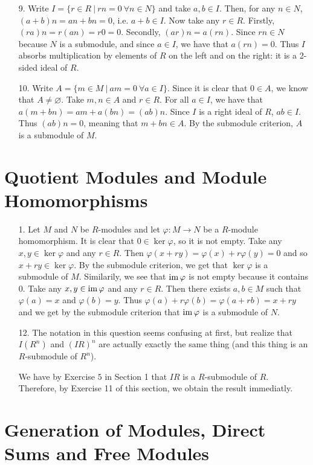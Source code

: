 \begin{enumerate}
\item[9.]
Write $I = \{r\in R\ |\ rn = 0\ \forall n\in N\}$ and take $a,b\in I$. Then, for any $n\in N$, $(a+b)n = an+bn=0$, i.e. $a+b \in I$. Now take any $r\in R$. Firstly, $(ra)n = r(an) = r0 = 0$. Secondly, $(ar)n = a(rn)$. Since $rn \in N$ because $N$ is a submodule, and since $a\in I$, we have that $a(rn)=0$. Thus $I$ absorbs multiplication by elements of $R$ on the left and on the right: it is a 2-sided ideal of $R$.

\item[10.]
Write $A=\{m\in M\ |\ am=0\ \forall a\in I\}$. Since it is clear that $0\in A$, we know that $A\neq\varnothing$. Take $m,n\in A$ and $r \in R$. For all $a\in I$, we have that $a(m+bn) = am+a(bn) = (ab)n$. Since $I$ is a right ideal of $R$, $ab\in I$. Thus $(ab)n=0$, meaning that $m+bn\in A$. By the submodule criterion, $A$ is a submodule of $M$.
\end{enumerate}

\section{Quotient Modules and Module Homomorphisms}

\begin{enumerate}
\item[1.]
Let $M$ and $N$ be $R$-modules and let $\varphi:M\to N$ be a $R$-module homomorphism. It is clear that $0\in\ker\varphi$, so it is not empty. Take any $x,y\in\ker\varphi$ and any $r\in R$. Then $\varphi(x+ry) = \varphi(x)+r\varphi(y)=0$ and so $x+ry\in\ker\varphi$. By the submodule criterion, we get that $\ker\varphi$ is a submodule of $M$.
Similarily, we see that $\operatorname{im}\varphi$ is not empty because it contains $0$. Take any $x,y\in \operatorname{im}\varphi$ and any $r\in R$. Then there exists $a,b\in M$ such that $\varphi(a)=x$ and $\varphi(b)=y$. Thus $\varphi(a)+r\varphi(b) = \varphi(a+rb)=x+ry$ and we get by the submodule criterion that $\operatorname{im}\varphi$ is a submodule of $N$.

\item[12.]
The notation in this question seems confusing at first, but realize that $I(R^n)$ and $(IR)^n$ are actually exactly the same thing (and this thing is an $R$-submodule of $R^n$).

We have by Exercise $5$ in Section 1 that $IR$ is a $R$-submodule of $R$. Therefore, by Exercise 11 of this section, we obtain the result immediatly.
\end{enumerate}

\section{Generation of Modules, Direct Sums and Free Modules}

